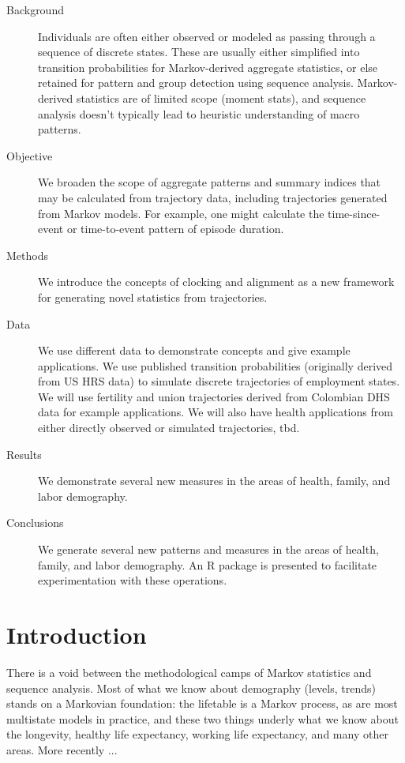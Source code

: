 \documentclass{article}
\begin{document}
\begin{description}
\item[Background]{Individuals are often either observed or modeled as passing through a sequence of discrete states. These are usually either simplified into transition probabilities for Markov-derived aggregate statistics, or else retained for pattern and group detection using sequence analysis. Markov-derived statistics are of limited scope (moment stats), and sequence analysis doesn't typically lead to heuristic understanding of macro patterns.}
\item[Objective]{We broaden the scope of aggregate patterns and summary indices that may be calculated from trajectory data, including trajectories generated from Markov models. For example, one might calculate the time-since-event or time-to-event pattern of episode duration.}
\item[Methods]{We introduce the concepts of clocking and alignment as a new framework for generating novel statistics from trajectories. }
\item[Data]{We use different data to demonstrate concepts and give example applications. We use published transition probabilities (originally derived from US HRS data) to simulate discrete trajectories of employment states. We will use fertility and union trajectories derived from Colombian DHS data for example applications. We will also have health applications from either directly observed or simulated trajectories, tbd.}
\item[Results]{We demonstrate several new measures in the areas of health, family, and labor demography.}
\item[Conclusions]{We generate several new patterns and measures in the areas of health, family, and labor demography. An R package is presented to facilitate experimentation with these operations.}
\end{description}

\section{Introduction}

There is a void between the methodological camps of Markov statistics and sequence analysis. Most of what we know about demography (levels, trends) stands on a Markovian foundation: the lifetable is a Markov process, as are most multistate models in practice, and these two things underly what we know about the longevity, healthy life expectancy, working life expectancy, and many other areas. More recently ...
\end{document}
